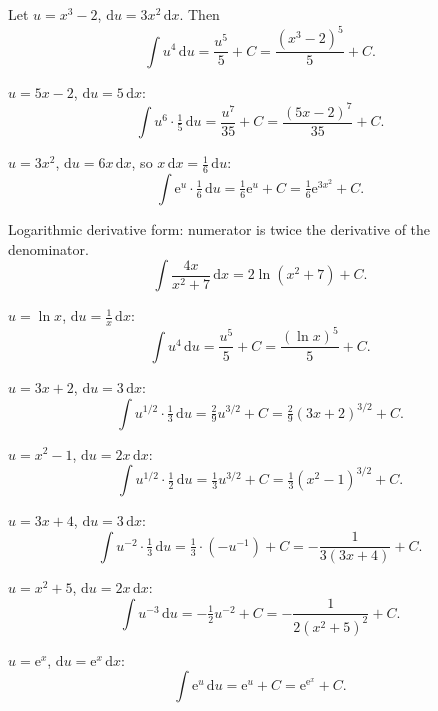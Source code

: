 \begin{solutions}
  \item Let $u=x^{3}-2$, $\mathrm{d}u=3x^{2}\,\mathrm{d}x$. Then
        \[
          \int u^{4}\,\mathrm{d}u=\frac{u^{5}}{5}+C=\frac{(x^{3}-2)^{5}}{5}+C .
        \]

  \item $u=5x-2$, $\mathrm{d}u=5\,\mathrm{d}x$:
        \[
          \int u^{6}\cdot\tfrac15\,\mathrm{d}u
            =\frac{u^{7}}{35}+C=\frac{(5x-2)^{7}}{35}+C .
        \]

  \item $u=3x^{2}$, $\mathrm{d}u=6x\,\mathrm{d}x$, so
        $x\,\mathrm{d}x=\tfrac16\,\mathrm{d}u$:
        \[
          \int \mathrm{e}^{u}\cdot\tfrac16\,\mathrm{d}u
            =\tfrac16\mathrm{e}^{u}+C=\tfrac16\mathrm{e}^{3x^{2}}+C .
        \]

  \item Logarithmic derivative form: numerator is twice the derivative of
        the denominator.
        \[
          \int \frac{4x}{x^{2}+7}\,\mathrm{d}x=2\ln(x^{2}+7)+C .
        \]

  \item $u=\ln x$, $\mathrm{d}u=\tfrac1x\,\mathrm{d}x$:
        \[
          \int u^{4}\,\mathrm{d}u=\frac{u^{5}}{5}+C=\frac{(\ln x)^{5}}{5}+C .
        \]

  \item $u=3x+2$, $\mathrm{d}u=3\,\mathrm{d}x$:
        \[
          \int u^{1/2}\cdot\tfrac13\,\mathrm{d}u
            =\tfrac29 u^{3/2}+C=\tfrac29(3x+2)^{3/2}+C .
        \]

  \item $u=x^{2}-1$, $\mathrm{d}u=2x\,\mathrm{d}x$:
        \[
          \int u^{1/2}\cdot\tfrac12\,\mathrm{d}u
            =\tfrac13 u^{3/2}+C=\tfrac13(x^{2}-1)^{3/2}+C .
        \]

  \item $u=3x+4$, $\mathrm{d}u=3\,\mathrm{d}x$:
        \[
          \int u^{-2}\cdot\tfrac13\,\mathrm{d}u
            =\tfrac13\cdot(-u^{-1})+C=-\frac{1}{3(3x+4)}+C .
        \]

  \item $u=x^{2}+5$, $\mathrm{d}u=2x\,\mathrm{d}x$:
        \[
          \int u^{-3}\,\mathrm{d}u
            =-\tfrac12 u^{-2}+C=-\frac{1}{2(x^{2}+5)^{2}}+C .
        \]

  \item $u=\mathrm{e}^{x}$, $\mathrm{d}u=\mathrm{e}^{x}\,\mathrm{d}x$:
        \[
          \int \mathrm{e}^{u}\,\mathrm{d}u
            =\mathrm{e}^{u}+C=\mathrm{e}^{\mathrm{e}^{x}}+C .
        \]


\end{solutions}
